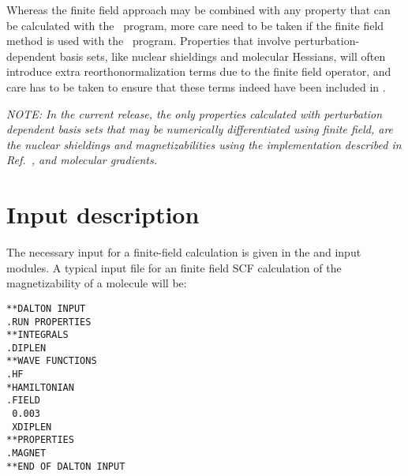 Whereas the finite field approach may be combined with any property
that can be calculated with the \resp\ program, more care need to be
taken if the finite field method is used with the \aba\
program. Properties that involve perturbation-dependent basis
sets,
like nuclear shieldings and molecular Hessians, will often introduce
extra reorthonormalization terms due to the finite field operator, and
care has to be taken to ensure that these terms indeed have been
included in \dalton . 

{\em NOTE: In the current release, the only properties
calculated with perturbation dependent basis sets that may be
numerically differentiated using finite field, are the nuclear shieldings
and magnetizabilities using the implementation described in
Ref.~\cite{arthkrabmjpjjcp102}, and molecular gradients.} 

\section{Input description}\label{sec:finiteinput}

\begin{center}
\end{center}

The necessary input for a finite-field calculation
is given in the 
 and  input modules. A typical input file
for an finite field SCF calculation of the
magnetizability of a molecule will be:

\begin{verbatim}
**DALTON INPUT
.RUN PROPERTIES
**INTEGRALS
.DIPLEN
**WAVE FUNCTIONS
.HF
*HAMILTONIAN
.FIELD
 0.003
 XDIPLEN
**PROPERTIES
.MAGNET
**END OF DALTON INPUT
\end{verbatim}

